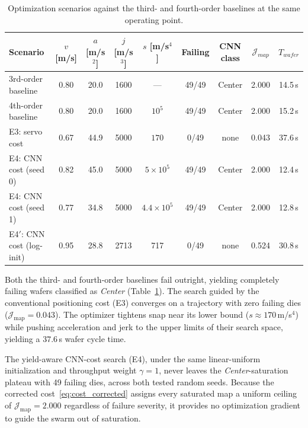 \begin{table}[htbp]
\centering
\caption{Optimization scenarios against the third- and fourth-order baselines at the same operating point.}
\label{tab:exp6_pso}
\setlength{\tabcolsep}{0.12cm}
\small
\begin{tabular}{lcccccccc}
\toprule
Scenario & $v$ [m/s] & $a$ [m/s$^2$] & $j$ [m/s$^3$] & $s$ [m/s$^4$] & Failing & CNN class & $\mathcal{J}_{map}$ & $T_{wafer}$ \\
\midrule
3rd-order baseline & 0.80 & 20.0 & 1600 & ---            & 49/49 & Center & 2.000 & 14.5\,s \\
4th-order baseline & 0.80 & 20.0 & 1600 & $10^5$         & 49/49 & Center & 2.000 & 15.2\,s \\
E3: servo cost     & 0.67 & 44.9 & 5000 & $170$ & 0/49  & none   & 0.043 & 37.6\,s \\
E4: CNN cost (seed 0) & 0.82 & 45.0 & 5000 & $5\times10^5$ & 49/49 & Center & 2.000 & 12.4\,s \\
E4: CNN cost (seed 1) & 0.77 & 34.8 & 5000 & $4.4\times10^5$ & 49/49  & Center   & 2.000 & 12.8\,s \\
E4$'$: CNN cost (log-init) & 0.95 & 28.8 & 2713 & 717 & 0/49 & none & 0.524 & 30.8\,s \\
\bottomrule
\end{tabular}
\end{table}

Both the third- and fourth-order baselines fail outright, yielding completely failing wafers classified as \textit{Center} (Table~\ref{tab:exp6_pso}). The search guided by the conventional positioning cost (E3) converges on a trajectory with zero failing dies ($\mathcal{J}_{\mathrm{map}} = 0.043$). The optimizer tightens snap near its lower bound ($s \approx 170$\,m/s$^4$) while pushing acceleration and jerk to the upper limits of their search space, yielding a $37.6$\,s wafer cycle time.

The yield-aware CNN-cost search (E4), under the same linear-uniform initialization and throughput weight $\gamma = 1$, never leaves the \textit{Center}-saturation plateau with 49 failing dies, across both tested random seeds. Because the corrected cost~\eqref{eq:cost_corrected} assigns every saturated map a uniform ceiling of $\mathcal{J}_{\mathrm{map}} = 2.000$ regardless of failure severity, it provides no optimization gradient to guide the swarm out of saturation.

